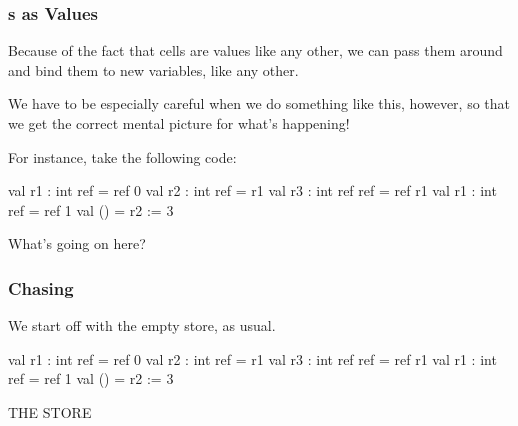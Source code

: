\documentclass[aspectratio=169]{beamer}
\newcommand{\topthing}[2]{
      \begin{minipage}[t][#1][t]{\textwidth}
        \vspace{\fill}
        #2
        \vspace{\fill}
      \end{minipage}
    }
\begin{document}
\begin{frame}[fragile]
  \frametitle{s as Values}

  Because of the fact that  cells are values like any other, we can
  pass them around and bind them to new variables, like any other.

  \pause
  \vspace{\fill}

  We have to be especially careful when we do something like this, however,
  so that we get the correct mental picture for what's happening!

  \pause
  \vspace{\fill}

  For instance, take the following code:

  \begin{codeblock}
    val r1 : int ref     = ref 0
    val r2 : int ref     = r1
    val r3 : int ref ref = ref r1
    val r1 : int ref     = ref 1
    val ()               = r2 := 3
  \end{codeblock}

  \pause
  \vspace{\fill}

  What's going on here?
\end{frame}

\begin{frame}[fragile]
  \frametitle{ Chasing}

  \topthing{0.2in}{
    We start off with the empty store, as usual.
  }

  \vspace{10pt}

  \begin{center}
    \begin{minipage}[t][2.1in][t]{0.6\textwidth}
      \vspace{\fill}
      \begin{codeblock}
        val r1 : int ref     = ref 0
        val r2 : int ref     = r1
        val r3 : int ref ref = ref r1
        val r1 : int ref     = ref 1
        val ()               = r2 := 3
      \end{codeblock}
      \vspace{\fill}
    \end{minipage}
    \hfill\vline\hfill
    \begin{minipage}[t][2.1in][t]{0.3\textwidth}
      \centering
      {\hspace{-20pt}\color{gray} \large THE STORE}

      \vspace{\fill}
      \begin{tikzpicture}
      \end{tikzpicture}
      \vspace{\fill}
    \end{minipage}
  \end{center}
\end{frame}
\end{document}

